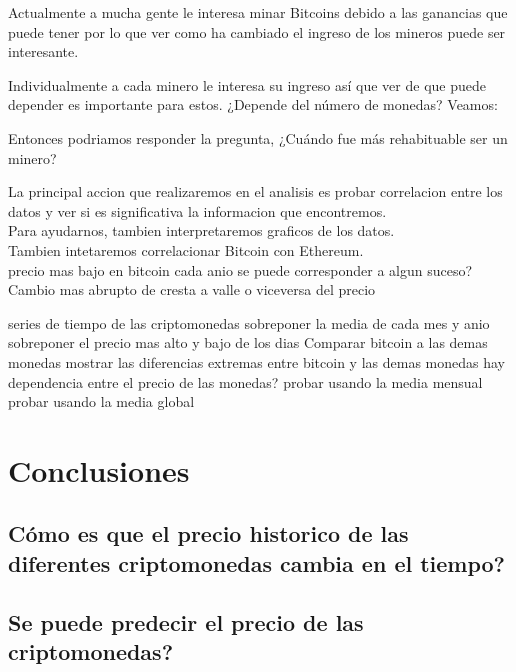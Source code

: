 \documentclass[12pt,letterpaper]{article}
\begin{document}
    Actualmente a mucha gente le interesa minar Bitcoins debido a las ganancias que puede tener por lo que ver como ha cambiado el ingreso de los mineros puede ser interesante.


    Individualmente a cada minero le interesa su ingreso así que ver de que puede depender es importante para estos. ¿Depende del número de monedas? Veamos:


    
    Entonces podriamos responder la pregunta, ¿Cuándo fue más rehabituable ser un minero?








    La principal accion que realizaremos en el analisis es probar correlacion entre los datos y ver si es significativa la informacion que encontremos.
    \\
    Para ayudarnos, tambien interpretaremos graficos de los datos.
    \\
    Tambien intetaremos correlacionar Bitcoin con Ethereum.
    \\
    precio mas bajo en bitcoin cada anio
        se puede corresponder a algun suceso?
    Cambio mas abrupto de cresta a valle o viceversa del precio

    series de tiempo de las criptomonedas
        sobreponer la media de cada mes y anio
    sobreponer el precio mas alto y bajo de los dias
    Comparar bitcoin a las demas monedas
        mostrar las diferencias extremas entre bitcoin y las demas monedas
    hay dependencia entre el precio de las monedas?
        probar usando la media mensual
        probar usando la media global

\section*{Conclusiones}

	\subsection*{C\'omo es que el precio historico de las diferentes criptomonedas cambia en el tiempo?}
	\subsection*{Se puede predecir el precio de las criptomonedas?}
\end{document}
